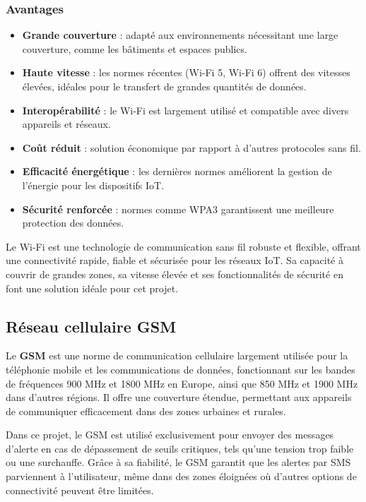 \subsubsection*{Avantages}
\begin{itemize}
	\item \textbf{Grande couverture} : adapté aux environnements nécessitant une large couverture, comme les bâtiments et espaces publics.
	\item \textbf{Haute vitesse} : les normes récentes (Wi-Fi 5, Wi-Fi 6) offrent des vitesses élevées, idéales pour le transfert de grandes quantités de données.
	\item \textbf{Interopérabilité} : le Wi-Fi est largement utilisé et compatible avec divers appareils et réseaux.
	\item \textbf{Coût réduit} : solution économique par rapport à d'autres protocoles sans fil.
	\item \textbf{Efficacité énergétique} : les dernières normes améliorent la gestion de l'énergie pour les dispositifs IoT.
	\item \textbf{Sécurité renforcée} : normes comme WPA3 garantissent une meilleure protection des données.
\end{itemize}


Le Wi-Fi est une technologie de communication sans fil robuste et flexible, offrant une connectivité rapide, fiable et sécurisée pour les réseaux IoT. Sa capacité à couvrir de grandes zones, sa vitesse élevée et ses fonctionnalités de sécurité en font une solution idéale pour cet projet.
\subsection{Réseau cellulaire GSM}

Le \textbf{GSM} est une norme de communication cellulaire largement utilisée pour la téléphonie mobile et les communications de données, fonctionnant sur les bandes de fréquences 900 MHz et 1800 MHz en Europe, ainsi que 850 MHz et 1900 MHz dans d'autres régions. Il offre une couverture étendue, permettant aux appareils de communiquer efficacement dans des zones urbaines et rurales.

Dans ce projet, le GSM est utilisé exclusivement pour envoyer des messages d'alerte en cas de dépassement de seuils critiques, tels qu'une tension trop faible ou une surchauffe. Grâce à sa fiabilité, le GSM garantit que les alertes par SMS parviennent à l'utilisateur, même dans des zones éloignées où d'autres options de connectivité peuvent être limitées.

